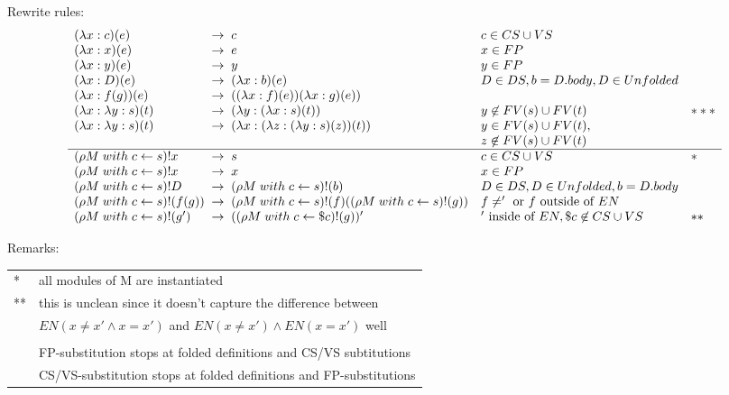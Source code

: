 \documentclass[a4paper]{article}
\begin{document}
Rewrite rules:\\

\[
\begin{array}{l@{\;\;\rightarrow\;\;}lll}
  (\lambda x : c)(e) &  c & c \in CS \cup VS & \\
  (\lambda x : x)(e) &  e & x \in FP &\\
  (\lambda x : y)(e) &  y & y \in FP&\\
  (\lambda x : D)(e) &  (\lambda x : b)(e) & D \in DS, b = D.body,
                                             D \in Unfolded&\\
  (\lambda x : f(g))(e) & ((\lambda x : f)(e))(\lambda x : g)(e)) &\\
  (\lambda x : \lambda y : s)(t)
                     & (\lambda y : (\lambda x : s)(t))
                          & y \not \in FV(s) \cup FV(t) & ***\\
  (\lambda x : \lambda y : s)(t)
                     & (\lambda x : (\lambda z : (\lambda y : s)(z))(t))
                          & y \in FV(s) \cup FV(t) , \\
  \multicolumn{2}{l}{} & z \not \in FV(s) \cup FV(t) & \\
  \hline
  (\rho M\; with\; c \leftarrow s)! x & s & c \in CS \cup VS & * \\
  (\rho M\; with\; c \leftarrow s)! x & x & x \in FP &\\
  (\rho M\; with\; c \leftarrow s)!D & (\rho M\; with\; c \leftarrow s)!(b)
                          & D\in DS, D \in Unfolded, b = D.body&\\
  (\rho M\; with\; c \leftarrow s)!(f(g))
                     & (\rho M\; with\; c \leftarrow s)!(f)
                       ((\rho M\; with\; c \leftarrow s)!(g) ) & f \neq '\mbox{ or }f\mbox{ outside of }EN  &\\
  (\rho M\; with\; c \leftarrow s)!(g')
                     & ((\rho M\; with\; c \leftarrow \$c)!(g) )' & '\mbox{ inside of }EN, \$c \not \in CS\cup VS  &**\\
\end{array}
\]

Remarks:\\
\begin{tabular}{ll}
  * & all modules of M are instantiated \\
  ** & this is unclean since it doesn't capture the difference between \\
     &  $EN (x\neq x' \land x=x')$ and $EN (x\neq x') \land EN (x=x')$ well\\
  \\
  & FP-substitution stops at folded definitions and CS/VS subtitutions\\
  & CS/VS-substitution stops at folded definitions and FP-substitutions\\
\end{tabular}
\end{document}
